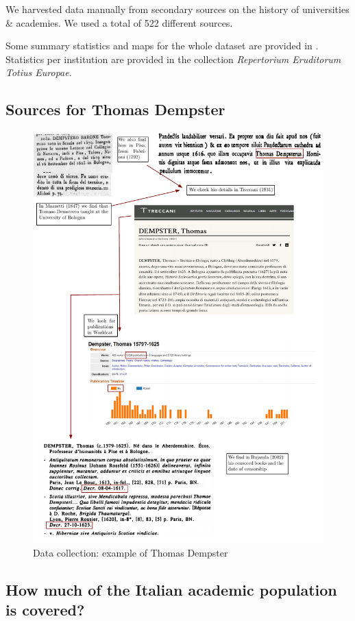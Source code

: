 We harvested data  manually from secondary sources on the history of universities \& academies. We used a total of 522 different sources.

Some summary statistics and maps for the whole dataset are provided in . Statistics per institution are provided in the collection \textit{Repertorium Eruditorum Totius Europae}.





\clearpage
\subsection{Sources for Thomas Dempster}\label{appendix:dempster}


\begin{figure}[!hb]
\begin{center}
\includegraphics[width=.8\textwidth]{dempster0.pdf}
\end{center}
\caption{Data collection: example of Thomas Dempster}\label{fig:dempster}
\end{figure}


\clearpage
\subsection{How much of the Italian academic population is covered?}\label{appendix:data2}

